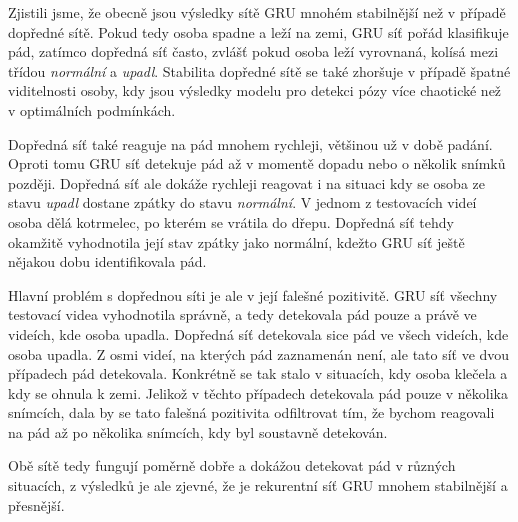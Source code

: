 Zjistili jsme, že obecně jsou výsledky sítě GRU mnohém stabilnější než v
případě dopředné sítě. Pokud tedy osoba spadne a leží na zemi, GRU síť pořád
klasifikuje pád, zatímco dopředná síť často, zvlášť pokud osoba leží vyrovnaná,
kolísá mezi třídou \textit{normální} a \textit{upadl}. Stabilita dopředné sítě
se také zhoršuje v případě špatné viditelnosti osoby, kdy jsou výsledky modelu
pro detekci pózy více chaotické než v optimálních podmínkách.

Dopředná síť také reaguje na pád mnohem rychleji, většinou už v době padání.
Oproti tomu GRU síť detekuje pád až v momentě dopadu nebo o několik snímků
později. Dopředná síť ale dokáže rychleji reagovat i na situaci kdy se osoba ze
stavu \textit{upadl} dostane zpátky do stavu \textit{normální}. V jednom z
testovacích videí osoba dělá kotrmelec, po kterém se vrátila do dřepu. Dopředná
síť tehdy okamžitě vyhodnotila její stav zpátky jako normální, kdežto GRU síť
ještě nějakou dobu identifikovala pád.

Hlavní problém s dopřednou síti je ale v její falešné pozitivitě. GRU síť
všechny testovací videa vyhodnotila správně, a tedy detekovala pád pouze a
právě ve videích, kde osoba upadla. Dopředná síť detekovala sice pád ve všech
videích, kde osoba upadla. Z osmi videí, na kterých pád zaznamenán není, ale
tato síť ve dvou případech pád detekovala. Konkrétně se tak stalo v situacích,
kdy osoba klečela a kdy se ohnula k zemi. Jelikož v těchto případech detekovala
pád pouze v několika snímcích, dala by se tato falešná pozitivita odfiltrovat
tím, že bychom reagovali na pád až po několika snímcích, kdy byl soustavně
detekován.

Obě sítě tedy fungují poměrně dobře a dokážou detekovat pád v různých
situacích, z výsledků je ale zjevné, že je rekurentní síť GRU mnohem
stabilnější a přesnější.

\endinput